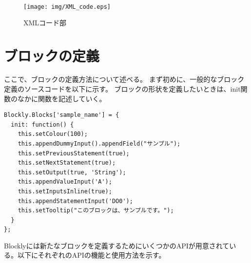 \documentclass{risepaper}
\begin{document}



\begin{figure}[h]
\begin{center}
\texttt{[image: img/XML\_code.eps]}
\caption{XMLコード部}%
\label{fig:XML_code}
\end{center}%
\end{figure}%

   \section{ブロックの定義}
   
ここで、ブロックの定義方法について述べる。
まず初めに、一般的なブロック定義のソースコードを以下に示す。
ブロックの形状を定義したいときは、init関数のなかに関数を記述していく。

\begin{lstlisting}[basicstyle=\ttfamily\footnotesize]
Blockly.Blocks['sample_name'] = {
  init: function() {
    this.setColour(100);
    this.appendDummyInput().appendField("サンプル");
    this.setPreviousStatement(true);
    this.setNextStatement(true);
    this.setOutput(true, 'String');
    this.appendValueInput('A');
    this.setInputsInline(true);
    this.appendStatementInput('DO0');
    this.setTooltip("このブロックは、サンプルです。");
  }
};
\end{lstlisting}

Blocklyには新たなブロックを定義するためにいくつかのAPIが用意されている。以下にそれぞれのAPIの機能と使用方法を示す。
\end{document}
